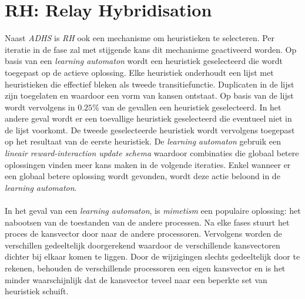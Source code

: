 \section{RH: Relay Hybridisation}

Naast \emph{ADHS} is \emph{RH} ook een mechanisme om heuristieken te selecteren. Per iteratie in de fase zal met stijgende kans dit mechanisme geactiveerd worden. Op basis van een \emph{learning automaton} wordt een heuristiek geselecteerd die wordt toegepast op de actieve oplossing. Elke heuristiek onderhoudt een lijst met heuristieken die effectief bleken als tweede transitiefunctie. Duplicaten in de lijst zijn toegelaten en waardoor een vorm van kansen ontstaat. Op basis van de lijst wordt vervolgens in $0.25\%$ van de gevallen een heuristiek geselecteerd. In het andere geval wordt er een toevallige heuristiek geselecteerd die eventueel niet in de lijst voorkomt. De tweede geselecteerde heuristiek wordt vervolgens toegepast op het resultaat van de eerste heuristiek. De \emph{learning automaton} gebruik een \emph{lineair reward-interaction update schema} waardoor combinaties die globaal betere oplossingen vinden meer kans maken in de volgende iteraties. Enkel wanneer er een globaal betere oplossing wordt gevonden, wordt deze actie beloond in de \emph{learning automaton}.

\paragraph{}
In het geval van een \emph{learning automaton}, is \emph{mimetism} een populaire oplossing: het nabootsen van de toestanden van de andere processen. Na elke fases stuurt het proces de kansvector door naar de andere processoren. Vervolgens worden de verschillen gedeeltelijk doorgerekend waardoor de verschillende kansvectoren dichter bij elkaar komen te liggen. Door de wijzigingen slechts gedeeltelijk door te rekenen, behouden de verschillende processoren een eigen kansvector en is het minder waarschijnlijk dat de kansvector teveel naar een beperkte set van heuristiek schuift.